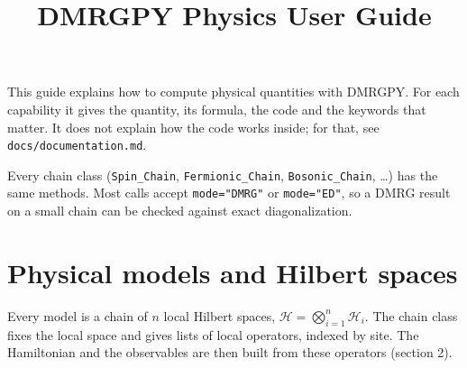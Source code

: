 \documentclass[11pt]{article}
\title{DMRGPY Physics User Guide}
\author{}
\date{}
\begin{document}
\maketitle

This guide explains how to compute physical quantities with DMRGPY. For each
capability it gives the quantity, its formula, the code and the keywords that
matter. It does not explain how the code works inside; for that, see
\texttt{docs/documentation.\allowbreak{}md}.

Every chain class (\texttt{Spin\_\allowbreak{}Chain}, \texttt{Fermionic\_\allowbreak{}Chain}, \texttt{Bosonic\_\allowbreak{}Chain}, \ldots) has
the same methods. Most calls accept \texttt{mode="DMRG"} or \texttt{mode="ED"}, so a DMRG
result on a small chain can be checked against exact diagonalization.

\tableofcontents

\section{Physical models and Hilbert spaces}

Every model is a chain of \(n\) local Hilbert spaces,
\(\mathcal H=\bigotimes_{i=1}^n\mathcal H_i\). The chain class fixes the local
space and gives lists of local operators, indexed by site. The Hamiltonian
and the observables are then built from these operators (section 2).
\end{document}
